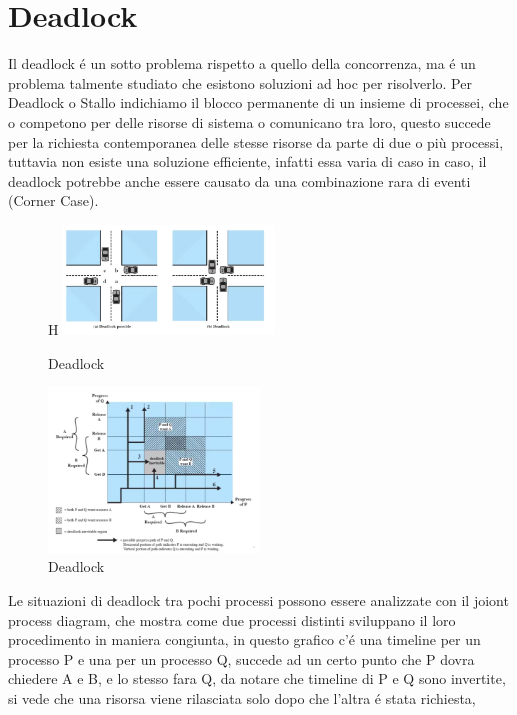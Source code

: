 \section{Deadlock}

Il deadlock é un sotto problema rispetto a quello della concorrenza, ma é un problema talmente studiato che
esistono soluzioni ad hoc per risolverlo. Per Deadlock o Stallo indichiamo il blocco permanente di un insieme di processei, che o
competono per delle risorse di sistema o comunicano tra loro, questo succede per la richiesta contemporanea delle stesse risorse da
parte di due o più processi, tuttavia non esiste una soluzione efficiente, infatti essa varia di caso in caso, il deadlock potrebbe
anche essere causato da una combinazione rara di eventi (Corner Case).
\begin{figure}{H}
    \centering
    \includegraphics[width=0.5\textwidth]{immagini/DeadlockVItaComune}
    \caption{Deadlock}
    \label{fig:Deadlock}
\end{figure}
\begin{figure}[H]
    \centering
    \includegraphics[width=0.5\textwidth]{immagini/JointProcessDiagram}
    \caption{Deadlock}
\end{figure}
Le situazioni di deadlock tra pochi processi possono essere analizzate con il joiont process diagram, che mostra
come due processi distinti sviluppano il loro procedimento in maniera congiunta, in questo grafico c'é una timeline
per un processo P e una per un processo Q, succede ad un certo punto che P dovra chiedere A e B, e lo stesso fara Q, da
notare che timeline di P e Q sono invertite, si vede che una risorsa viene rilasciata solo dopo che l'altra é stata richiesta,
